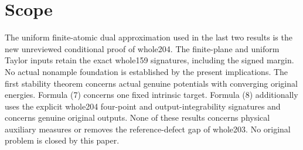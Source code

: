 \documentclass[11pt]{article}
\begin{document}
\section{Scope}
The uniform finite-atomic dual approximation used in the last
two results is the new unreviewed conditional proof of whole204.
The finite-plane and uniform Taylor inputs retain the exact
whole159 signatures, including the signed margin. No actual
nonample foundation is established by the present implications.
The first stability theorem concerns actual genuine potentials
with converging original energies. Formula (7) concerns one
fixed intrinsic target. Formula (8) additionally uses the
explicit whole204 four-point and output-integrability
signatures and concerns genuine original outputs.
None of these results concerns physical auxiliary measures
or removes the reference-defect
gap of whole203. No original problem is closed by this paper.
\end{document}
